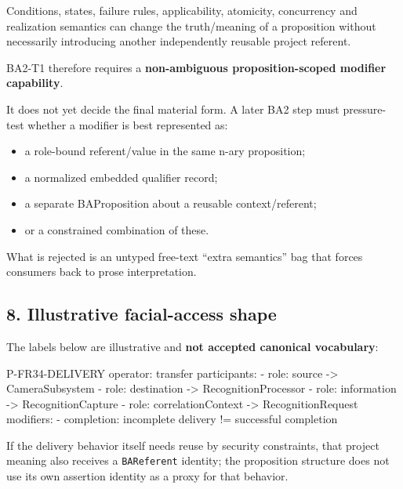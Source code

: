 \documentclass[
  10pt,
  letterpaper,
]{article}
\newenvironment{Shaded}{}{}
\newcommand{\NormalTok}[1]{#1}
\providecommand{\tightlist}{%
  \setlength{\itemsep}{0pt}\setlength{\parskip}{0pt}}
\begin{document}
Conditions, states, failure rules, applicability, atomicity, concurrency
and realization semantics can change the truth/meaning of a proposition
without necessarily introducing another independently reusable project
referent.

BA2-T1 therefore requires a \textbf{non-ambiguous proposition-scoped
modifier capability}.

It does not yet decide the final material form. A later BA2 step must
pressure-test whether a modifier is best represented as:

\begin{itemize}
\tightlist
\item
  a role-bound referent/value in the same n-ary proposition;
\item
  a normalized embedded qualifier record;
\item
  a separate BAProposition about a reusable context/referent;
\item
  or a constrained combination of these.
\end{itemize}

What is rejected is an untyped free-text ``extra semantics'' bag that
forces consumers back to prose interpretation.

\subsection{8. Illustrative facial-access
shape}\label{illustrative-facial-access-shape}

The labels below are illustrative and \textbf{not accepted canonical
vocabulary}:

\begin{Shaded}
\begin{Highlighting}[]
\NormalTok{P{-}FR34{-}DELIVERY}
\NormalTok{operator: transfer}
\NormalTok{participants:}
\NormalTok{  {-} role: source              {-}\textgreater{} CameraSubsystem}
\NormalTok{  {-} role: destination         {-}\textgreater{} RecognitionProcessor}
\NormalTok{  {-} role: information         {-}\textgreater{} RecognitionCapture}
\NormalTok{  {-} role: correlationContext  {-}\textgreater{} RecognitionRequest}
\NormalTok{modifiers:}
\NormalTok{  {-} completion: incomplete delivery != successful completion}
\end{Highlighting}
\end{Shaded}

If the delivery behavior itself needs reuse by security constraints,
that project meaning also receives a \texttt{BAReferent} identity; the
proposition structure does not use its own assertion identity as a proxy
for that behavior.
\end{document}
